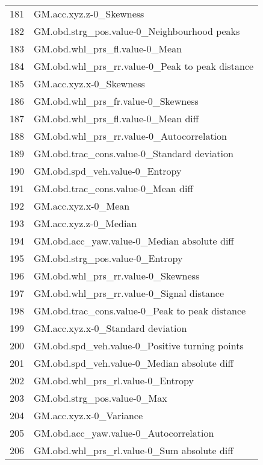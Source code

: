 \begin{tabular}{ll}
181 &                            GM.acc.xyz.z-0\_Skewness \\
182 &        GM.obd.strg\_pos.value-0\_Neighbourhood peaks \\
183 &                     GM.obd.whl\_prs\_fl.value-0\_Mean \\
184 &    GM.obd.whl\_prs\_rr.value-0\_Peak to peak distance \\
185 &                            GM.acc.xyz.x-0\_Skewness \\
186 &                 GM.obd.whl\_prs\_fr.value-0\_Skewness \\
187 &                GM.obd.whl\_prs\_fl.value-0\_Mean diff \\
188 &          GM.obd.whl\_prs\_rr.value-0\_Autocorrelation \\
189 &        GM.obd.trac\_cons.value-0\_Standard deviation \\
190 &                     GM.obd.spd\_veh.value-0\_Entropy \\
191 &                 GM.obd.trac\_cons.value-0\_Mean diff \\
192 &                                GM.acc.xyz.x-0\_Mean \\
193 &                              GM.acc.xyz.z-0\_Median \\
194 &        GM.obd.acc\_yaw.value-0\_Median absolute diff \\
195 &                    GM.obd.strg\_pos.value-0\_Entropy \\
196 &                 GM.obd.whl\_prs\_rr.value-0\_Skewness \\
197 &          GM.obd.whl\_prs\_rr.value-0\_Signal distance \\
198 &     GM.obd.trac\_cons.value-0\_Peak to peak distance \\
199 &                  GM.acc.xyz.x-0\_Standard deviation \\
200 &     GM.obd.spd\_veh.value-0\_Positive turning points \\
201 &        GM.obd.spd\_veh.value-0\_Median absolute diff \\
202 &                  GM.obd.whl\_prs\_rl.value-0\_Entropy \\
203 &                        GM.obd.strg\_pos.value-0\_Max \\
204 &                            GM.acc.xyz.x-0\_Variance \\
205 &             GM.obd.acc\_yaw.value-0\_Autocorrelation \\
206 &        GM.obd.whl\_prs\_rl.value-0\_Sum absolute diff \\

\end{tabular}
